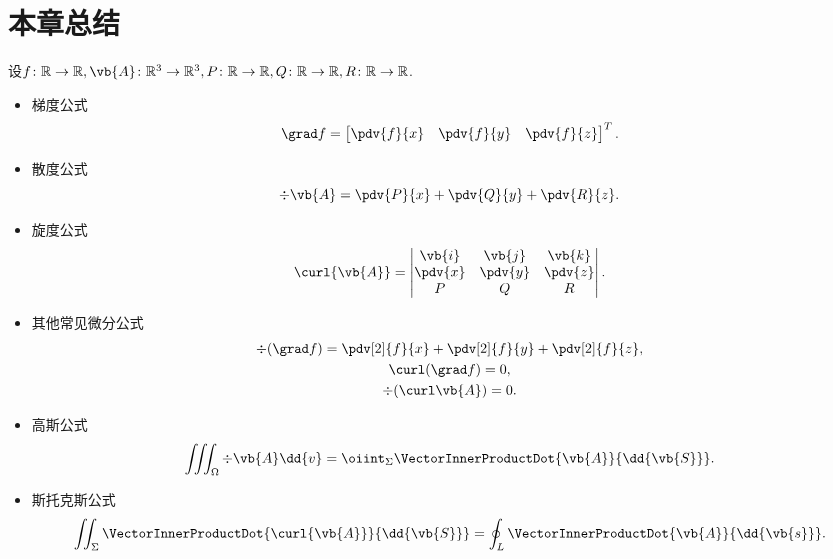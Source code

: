 \section{本章总结}
设\(f\colon\mathbb{R}\to\mathbb{R},
\vb{A}\colon\mathbb{R}^3\to\mathbb{R}^3,
P\colon\mathbb{R}\to\mathbb{R},
Q\colon\mathbb{R}\to\mathbb{R},
R\colon\mathbb{R}\to\mathbb{R}\).
\begin{itemize}
	\item 梯度公式\[
		\grad f
		= \begin{bmatrix}
			\pdv{f}{x} & \pdv{f}{y} & \pdv{f}{z}
		\end{bmatrix}^T.
	\]

	\item 散度公式\[
		\div{\vb{A}}
		= \pdv{P}{x}+\pdv{Q}{y}+\pdv{R}{z}.
	\]

	\item 旋度公式\[
		\curl{\vb{A}}
		= \begin{vmatrix}
			\vb{i} & \vb{j} & \vb{k} \\
			\pdv{x} & \pdv{y} & \pdv{z} \\
			P & Q & R
		\end{vmatrix}.
	\]

	\item 其他常见微分公式\begin{gather*}
		\div(\grad f)
		= \pdv[2]{f}{x} + \pdv[2]{f}{y} + \pdv[2]{f}{z}, \\
		\curl(\grad f)
		= 0, \\
		\div(\curl \vb{A})
		= 0.
	\end{gather*}

	\item 高斯公式\[
		\iiint_\Omega \div{\vb{A}} \dd{v}
		= \oiint_\Sigma \VectorInnerProductDot{\vb{A}}{\dd{\vb{S}}}.
	\]

	\item 斯托克斯公式\[
		\iint_\Sigma \VectorInnerProductDot{\curl{\vb{A}}}{\dd{\vb{S}}}
		= \oint_L \VectorInnerProductDot{\vb{A}}{\dd{\vb{s}}}.
	\]
\end{itemize}

